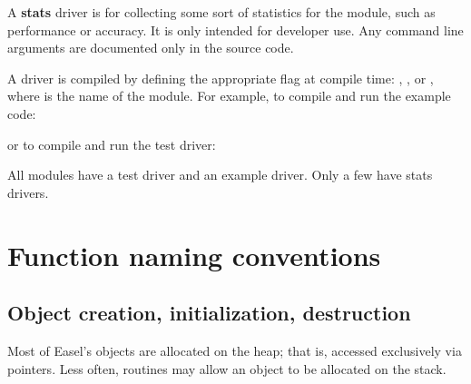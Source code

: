 A \textbf{stats} driver is for collecting some sort of statistics for
the module, such as performance or accuracy. It is only intended for
developer use. Any command line arguments are documented only in the
source code.

A driver is compiled by defining the appropriate flag at compile time:
, , or
, where  is the name of the
module. For example, to compile and run the  example
code:

\begin{cchunk}
\end{cchunk}

or to compile and run the  test driver:

\begin{cchunk}
\end{cchunk}

All modules have a test driver and an example driver. Only a few have
stats drivers.



\section{Function naming conventions}

\subsection{Object creation, initialization, destruction}

Most of Easel's objects are allocated on the heap; that is, accessed
exclusively via pointers. Less often, routines may allow an object to
be allocated on the stack.

